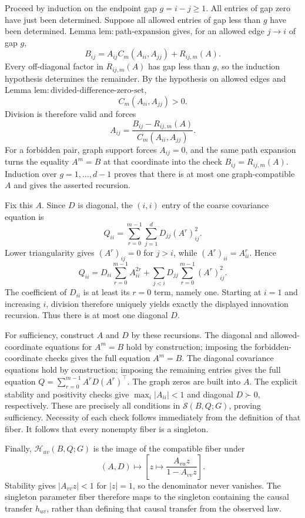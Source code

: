Proceed by induction on the endpoint gap \(g=i-j\ge1\).  All entries of gap zero have just been determined.  Suppose all allowed entries of gap less than \(g\) have been determined.  Lemma \(\mathrm{lem{:}path\mbox{-}expansion}\) gives, for an allowed edge \(j\to i\) of gap \(g\),
\[
 B_{ij}=A_{ij}C_m(A_{ii},A_{jj})+R_{ij,m}(A).
\]
Every off-diagonal factor in \(R_{ij,m}(A)\) has gap less than \(g\), so the induction hypothesis determines the remainder.  By the hypothesis on allowed edges and Lemma \(\mathrm{lem{:}divided\mbox{-}difference\mbox{-}zero\mbox{-}set}\),
\[
 C_m(A_{ii},A_{jj})>0.
\]
Division is therefore valid and forces
\[
 A_{ij}=\frac{B_{ij}-R_{ij,m}(A)}{C_m(A_{ii},A_{jj})}.
\]
For a forbidden pair, graph support forces \(A_{ij}=0\), and the same path expansion turns the equality \(A^m=B\) at that coordinate into the check \(B_{ij}=R_{ij,m}(A)\).  Induction over \(g=1,\ldots,d-1\) proves that there is at most one graph-compatible \(A\) and gives the asserted recursion.

Fix this \(A\).  Since \(D\) is diagonal, the \((i,i)\) entry of the coarse covariance equation is
\[
 Q_{ii}
 =\sum_{r=0}^{m-1}\sum_{j=1}^{d}D_{jj}(A^r)_{ij}^{2}.
\]
Lower triangularity gives \((A^r)_{ij}=0\) for \(j>i\), while \((A^r)_{ii}=A_{ii}^r\).  Hence
\[
 Q_{ii}
 =D_{ii}\sum_{r=0}^{m-1}A_{ii}^{2r}
  +\sum_{j<i}D_{jj}\sum_{r=0}^{m-1}(A^r)_{ij}^{2}.
\]
The coefficient of \(D_{ii}\) is at least its \(r=0\) term, namely one.  Starting at \(i=1\) and increasing \(i\), division therefore uniquely yields exactly the displayed innovation recursion.  Thus there is at most one diagonal \(D\).

For sufficiency, construct \(A\) and \(D\) by these recursions.  The diagonal and allowed-coordinate equations for \(A^m=B\) hold by construction; imposing the forbidden-coordinate checks gives the full equation \(A^m=B\).  The diagonal covariance equations hold by construction; imposing the remaining entries gives the full equation \(Q=\sum_{r=0}^{m-1}A^rD(A^r)^\top\).  The graph zeros are built into \(A\).  The explicit stability and positivity checks give \(\max_i|A_{ii}|<1\) and diagonal \(D\succ0\), respectively.  These are precisely all conditions in \(\mathcal S(B,Q;G)\), proving sufficiency.  Necessity of each check follows immediately from the definition of that fiber.  It follows that every nonempty fiber is a singleton.

Finally, \(\mathcal H_{uv}(B,Q;G)\) is the image of the compatible fiber under
\[
 (A,D)\longmapsto \left[z\longmapsto\frac{A_{vu}z}{1-A_{vv}z}\right].
\]
Stability gives \(|A_{vv}z|<1\) for \(|z|=1\), so the denominator never vanishes.  The singleton parameter fiber therefore maps to the singleton containing the causal transfer \(h_{uv}\), rather than defining that causal transfer from the observed law.

